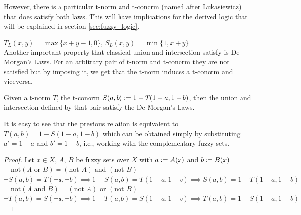 However, there is a particular t-norm and t-conorm (named after Lukasiewicz) that does satisfy both laws. This will have implications for the derived logic that will be explained in section \ref{sec:fuzzy_logic}. 

\hspace{10em}$T_L(x,y)=\max\{x+y-1,0\},\, S_L(x,y)=\min\{1,x+y\}$\\

Another important property that classical union and intersection satisfy is De Morgan's Laws. For an arbitrary pair of t-norm and t-conorm they are not satisfied but by imposing it, we get that the t-norm induces a t-conorm and viceversa.

\begin{proposition}
  Given a t-norm $T$, the t-conorm $S(a,b)\mathrel{\mathop:}= 1 - T(1-a, 1-b)$, then the union and intersection defined by that pair satisfy the De Morgan's Laws.
\end{proposition}
\begin{remark}
  It is easy to see that the previous relation is equivalent to $T(a,b) = 1-S(1-a, 1-b)$ which can be obtained simply by substituting $a'=1-a$ and $b'=1-b$, i.e., working with the complementary fuzzy sets.
\end{remark}

\begin{proof}
  Let $x\in X$, $A$, $B$ be fuzzy sets over $X$ with $a \mathrel{\mathop:}= A(x)$ and $b \mathrel{\mathop:}= B(x)$\\

  $\quad \boxed{\text{not}(A \text{ or } B) = (\text{not } A) \text{ and } (\text{not } B)}$\\[0.5em]
  $\lnot S(a,b) = T(\lnot a, \lnot b) \implies 1 - S(a,b) = T(1-a, 1-b) \implies S(a,b) = 1 - T(1-a, 1-b)$\\

  $\quad \boxed{\text{not}(A \text{ and } B) = (\text{not } A) \text{ or } (\text{not } B)}$\\[0.5em]
  $\lnot T(a,b) = S(\lnot a, \lnot b) \implies 1 - T(a,b) = S(1-a, 1-b) \implies T(a,b) = 1 - S(1-a, 1-b)$

\end{proof}


